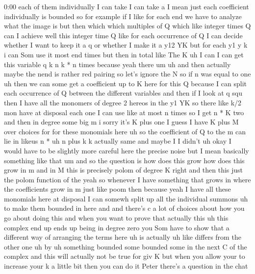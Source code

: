 \begin{unfinished}{0:00}
each  of  them  individually  I  can
take  I  can  take
a  I  mean  just  each  coefficient
individually  is  bounded  so  for  example
if  I  like  for  each  end  we  have  to
analyze  what  the  image
is  but  then  which  which  multiples  of  Q
which  like  integer  times  Q  can  I
achieve  well  this  integer  time  Q  like
for  each  occurrence  of  Q  I  can  decide
whether  I  want  to  keep  it  a  q  or  whether
I  make  it  a  y12
YK  but  for  each  y1  y  k  i  can  Som  use  it
most  end
times  but  then  in  total  like  The  K  uh  I
can  I  can  get  this  variable  q  k  n  k  *  n
times  because  yeah
there
um
uh  and  then  actually  maybe  the  nend  is
rather  red  pairing  so  let's  ignore  the  N
so  if  n  was  equal  to  one  uh  then  we  can
some  get  a  coefficient  up  to  K  here  for
this  Q  because  I  can  split  each
occurrence  of  Q  between  the  different
variables  and  then  if  I  look  at  q
squ  then  I  have  all  the  monomers  of
degree  2  hereos  in  the  y1  YK  so  there
like  k/2  mon  have  at  disposal  each  one  I
can  use  like  at  most  n
times  so  I  get  n  *  K  two  and  then  in
degree  some  big  m  i  sorry  it's  K  plus
one  I  guess  I  have  K  plus  M  over  choices
for  for  these  monomials  here
uh
so
the
coefficient  of  Q  to  the
m  can  lie
in  likeus  n
*  uh  n  plus  k
k  actually
same  and  maybe  I  I  didn't  uh
okay  I  would  have  to  be  slightly  more
careful  here  the  precise  noise  but  I
mean  basically  something  like  that  um
and  so  the  question  is  how  does  this
grow  how  does  this  grow  in  m  and  in  M
this  is  precisely  polom  of  degree  K
right  and  then  this  just  the  polom
function  of
the
yeah  so  whenever  I  have  something  that
grows  in  where  the  coefficients  grow  in
m  just  like  poom  then  because  yeah  I
have  all  these  monomials  here  at
disposal  I  can  somewh  split  up  all  the
individual  summons
uh  to  make  them  bounded  in
here  and  and  there's  c  a  lot  of  choices
about  how  you  go  about  doing  this  and
when  you  want  to  prove  that  actually
this  uh  this  complex  end  up  ends  up
being  in  degree  zero  you  Som  have  to
show  that  a  different  way  of  arranging
the  terms  here  uh  is
actually  uh  like  differs  from  the  other
one  uh  by  uh  something  bounded  some
bounded  some  in  the  next  C  of  the
complex  and  this  will  actually  not  be
true  for  giv  K  but  when  you  allow  your
to  increase  your  k  a  little  bit  then  you
can  do
it
Peter  there's  a  question  in  the  chat

\end{unfinished}
